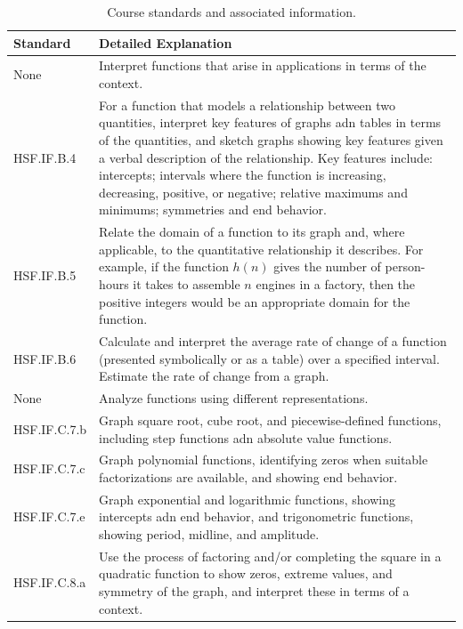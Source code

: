 \documentclass[12pt, oneside]{book}
\begin{document}
\begin{table}[h]
    \centering
    \caption{Course standards and associated information.}
    \vspace{0.3cm} %
    \begin{tabularx}{\textwidth}{l X} %
        \toprule
        \textbf{Standard} & \textbf{Detailed Explanation} \\
        \midrule
        None & Interpret functions that arise in applications in terms of the context. \\
        HSF.IF.B.4 & For a function that models a relationship between two quantities, interpret key features of graphs adn tables in terms of the quantities, and sketch graphs showing key features given a verbal description of the relationship. Key features include: intercepts; intervals where the function is increasing, decreasing, positive, or negative; relative maximums and minimums; symmetries and end behavior. \\
        HSF.IF.B.5 & Relate the domain of a function to its graph and, where applicable, to the quantitative relationship it describes. For example, if the function $h(n)$ gives the number of person-hours it takes to assemble $n$ engines in a factory, then the positive integers would be an appropriate domain for the function. \\
        HSF.IF.B.6 & Calculate and interpret the average rate of change of a function (presented symbolically or as a table) over a specified interval. Estimate the rate of change from a graph. \\
        None & Analyze functions using different representations. \\
        HSF.IF.C.7.b & Graph square root, cube root, and piecewise-defined functions, including step functions adn absolute value functions. \\
        HSF.IF.C.7.c & Graph polynomial functions, identifying zeros when suitable factorizations are available, and showing end behavior. \\
        HSF.IF.C.7.e & Graph exponential and logarithmic functions, showing intercepts adn end behavior, and trigonometric functions, showing period, midline, and amplitude. \\
        HSF.IF.C.8.a & Use the process of factoring and/or completing the square in a quadratic function to show zeros, extreme values, and symmetry of the graph, and interpret these in terms of a context. \\

\end{tabularx}
\end{table}
\end{document}
